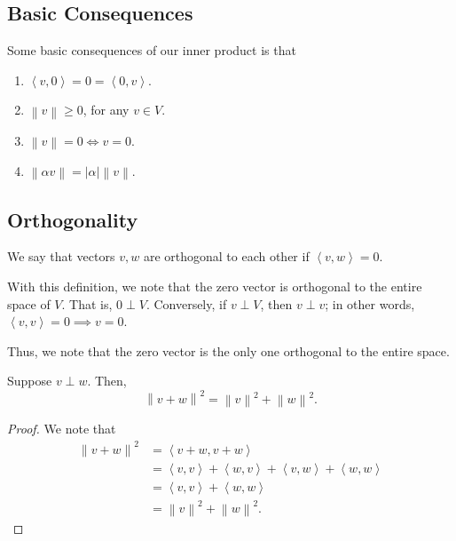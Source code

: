 \documentclass[openany]{book}
\newcommand{\norm}[1]{\left\lVert{#1}\right\rVert}
\newcommand{\innerproduct}[2]{\left\langle{#1}, {#2}\right\rangle}
\begin{document}
\subsection{Basic Consequences}
Some basic consequences of our inner product is that
\begin{enumerate}
	\item $\innerproduct{v}{0} = 0 = \innerproduct{0}{v}$.
	\item $\norm{v} \geq 0$, for any $v \in V$.
	\item $\norm{v} = 0 \iff v = 0$.
	\item $\norm{\alpha v} = \lvert \alpha \rvert\norm{v}$. %
\end{enumerate}

\subsection{Orthogonality}
\begin{defn}
	We say that vectors $v,w$ are orthogonal to each other if $\innerproduct{v}{w} = 0$.
\end{defn}

With this definition, we note that the zero vector is orthogonal to the entire space of $V$. That is, $0 \perp V$. Conversely, if $v \perp V$, then $v \perp v$; in other words, $\innerproduct{v}{v} = 0 \implies v = 0$.

Thus, we note that the zero vector is the only one orthogonal to the entire space.

\begin{thm}
	Suppose $v \perp w$. Then,
	\begin{equation*}
		\norm{v+w}^{2} = \norm{v}^{2} + \norm{w}^{2}.
	\end{equation*}
\end{thm}
\begin{proof}
	We note that
	\begin{align*}
		\norm{v + w}^{2} &= \innerproduct{v+w}{v+w} \\
		&= \innerproduct{v}{v} + \innerproduct{w}{v} + \innerproduct{v}{w} + \innerproduct{w}{w} \\
		&= \innerproduct{v}{v} + \innerproduct{w}{w} \\
		&= \norm{v}^{2} + \norm{w}^{2}.
	\end{align*}
\end{proof}
\end{document}
